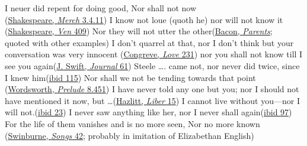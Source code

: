 \ea \label{ex:10-74}
\ea
I neuer did repent for doing good, Nor shall not now\\\hfill(\href{https://internetshakespeare.uvic.ca/doc/MV_F1/scene/3.4/index.html#tln-1735}{Shakespeare, \textit{Merch} 3.4.11})
\ex
I know not loue (quoth he) nor will not know it\\\hfill(\href{https://internetshakespeare.uvic.ca/doc/Ven_Q1/page/22/index.html#tln-405}{Shakespeare, \textit{Ven} 409})
\ex
Nor they will not utter the other\hfill(\href{https://archive.org/details/essayscoloursofg00bacouoft/page/14/mode/2up?q=%22utter+the+other%22&view=theater}{Bacon, \textit{Parents}}; \\\hfill quoted \citet[86]{bogholm1906bacon} with other examples)
\ex
I don't quarrel at that, nor I don't think but your conversation was very innocent \hfill(\href{https://archive.org/details/in.ernet.dli.2015.219151/page/n165/mode/2up?q=%22quarrel+at+that%22&view=theater}{Congreve, \textit{Love} 231})%
\ex
nor you shall not know till I see you again\hfill(\href{https://archive.org/details/journaltostellae00swifuoft/page/60/mode/2up?q=%22nor+you+shall+not+know%22&view=theater}{J. Swift, \textit{Journal} 61})
\ex
Steele {\dots}. came not, nor never did twice, since I knew him\hfill(\href{https://archive.org/details/journaltostellae00swifuoft/page/114/mode/2up?q=%22nor+never+did+twice%22&view=theater}{ibid 115})
\ex
Nor shall we not be tending towards that point\\\hfill(\href{https://en.wikisource.org/wiki/Page%3AThe_Prelude%2C_Wordsworth%2C_1850.djvu/247}{Wordsworth, \textit{Prelude} 8.451})
\ex
I have never told any one but you; nor I should not have mentioned it now, but {\dots}\hfill(\href{https://archive.org/details/liberamorisornew00hazlrich/page/14/mode/2up?q=%22have+never+told%22&view=theater}{Hazlitt, \textit{Liber} 15}) %
\ex
I cannot live without you---nor I will not.\hfill(\href{https://archive.org/details/liberamorisornew00hazlrich/page/22/mode/2up?q=%22cannot+live%22&view=theater}{ibid 23})
\ex
I never saw anything like her, nor I never shall again\hfill(\href{https://archive.org/details/liberamorisornew00hazlrich/page/96/mode/2up?q=%22never+saw+anything%22&view=theater}{ibid 97})
\ex
For the life of them vanishes and is no more seen, Nor no more known\\\hfill(\href{https://archive.org/details/cu31924013555911/page/n53/mode/2up?q=%22them+vanishes%22&view=theater}{Swinburne, \textit{Songs} 42}; probably in imitation of Elizabethan English) %
\z
\z

